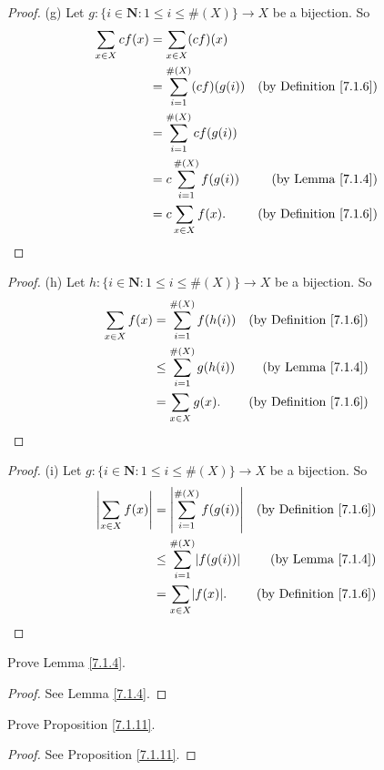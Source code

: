 \begin{proof}{(g)}
Let \(g : \{i \in \mathbf{N} : 1 \leq i \leq \#(X)\} \to X\) be a bijection.
So
\begin{align*}
\sum_{x \in X} cf(x) &= \sum_{x \in X} (cf)(x) \\
&= \sum_{i = 1}^{\#(X)} (cf)(g(i)) & \text{(by Definition \ref{7.1.6})} \\
&= \sum_{i = 1}^{\#(X)} cf(g(i)) \\
&= c\sum_{i = 1}^{\#(X)} f(g(i)) & \text{(by Lemma \ref{7.1.4})} \\
&= c\sum_{x \in X} f(x). & \text{(by Definition \ref{7.1.6})}
\end{align*}
\end{proof}

\begin{proof}{(h)}
Let \(h : \{i \in \mathbf{N} : 1 \leq i \leq \#(X)\} \to X\) be a bijection.
So
\begin{align*}
\sum_{x \in X} f(x) &= \sum_{i = 1}^{\#(X)} f(h(i)) & \text{(by Definition \ref{7.1.6})} \\
&\leq \sum_{i = 1}^{\#(X)} g(h(i)) & \text{(by Lemma \ref{7.1.4})} \\
&= \sum_{x \in X} g(x). & \text{(by Definition \ref{7.1.6})}
\end{align*}
\end{proof}

\begin{proof}{(i)}
Let \(g : \{i \in \mathbf{N} : 1 \leq i \leq \#(X)\} \to X\) be a bijection.
So
\begin{align*}
\abs*{\sum_{x \in X} f(x)} &= \abs*{\sum_{i = 1}^{\#(X)} f(g(i))} & \text{(by Definition \ref{7.1.6})} \\
&\leq \sum_{i = 1}^{\#(X)} \abs*{f(g(i))} & \text{(by Lemma \ref{7.1.4})} \\
&= \sum_{x \in X} \abs*{f(x)}. & \text{(by Definition \ref{7.1.6})}
\end{align*}
\end{proof}

\exercisesection

\begin{exercise}\label{ex 7.1.1}
Prove Lemma \ref{7.1.4}.
\end{exercise}

\begin{proof}
See Lemma \ref{7.1.4}.
\end{proof}

\begin{exercise}\label{ex 7.1.2}
Prove Proposition \ref{7.1.11}.
\end{exercise}

\begin{proof}
See Proposition \ref{7.1.11}.
\end{proof}
